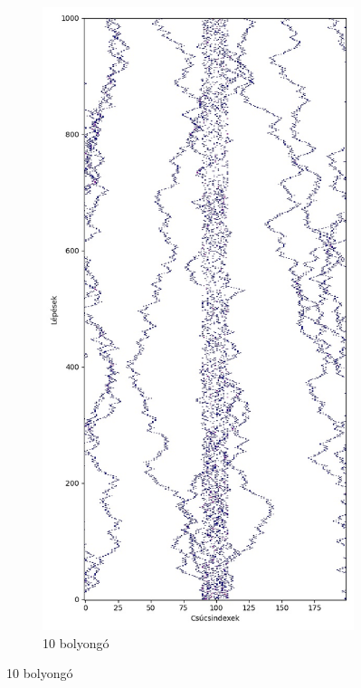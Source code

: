 \begin{figure}[H]
\begin{subfigure}{.45\linewidth}
  \end{subfigure}
  \begin{subfigure}{.45\linewidth}
    \centering
    \includegraphics[width=\linewidth]{./figures/sulyzo/sim01.jpg}
    \caption{10 bolyongó}
  \end{subfigure}
\end{figure}

